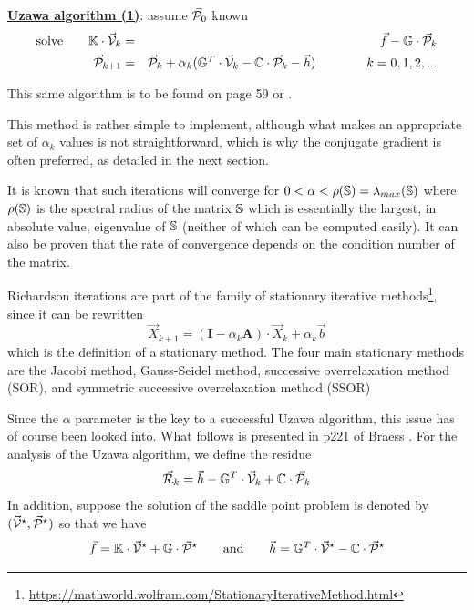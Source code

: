 \begin{mdframed}[backgroundcolor=blue!5]
\underline{\bf Uzawa algorithm (1)}: assume $\vec{\cal P}_0$ known
\begin{eqnarray}
\text{solve} \qquad \mathbb{K} \cdot \vec{\cal V}_k &=& \vec f - \mathbb{G}\cdot \vec {\cal P}_{k} \\
\vec{\cal P}_{k+1} &=& 
\vec{\cal P}_{k}  + \alpha_k (\mathbb{G}^T\cdot \vec{\cal V}_k  -{\mathbb{C}} \cdot \vec{\cal P}_{k} -\vec h)
\quad
\quad
\quad
\quad
k=0,1,2, ... \label{uzaa2}
\end{eqnarray}
\end{mdframed}
This same algorithm is to be found on page 59 or \cite{saramito}.

This method is rather simple to implement, although
what makes an appropriate set of $\alpha_k$ values is not 
straightforward, which is why the conjugate gradient is often preferred, 
as detailed in the next section. 

It is known that such iterations will converge for $0< \alpha < \rho({\mathbb{S}})= \lambda_{max}({\mathbb{S}})$ 
where $\rho({\mathbb{S}})$ is the spectral radius of the matrix ${\mathbb{S}}$
which is essentially the largest, in absolute value, eigenvalue of ${\mathbb{S}}$ (neither of which 
can be computed easily).  
It can also be proven that the rate of convergence depends on the condition number of the matrix.

Richardson iterations are part of the family of stationary iterative 
methods\footnote{\url{https://mathworld.wolfram.com/StationaryIterativeMethod.html}}, 
since it can be rewritten 
\begin{equation}
{\vec X}_{k+1} = ({\bm I} - \alpha_k {\bm A} ) \cdot {\vec X}_k + \alpha_k {\vec b}
\end{equation}
which is the definition of a stationary method. 
The four main stationary methods are the Jacobi method, 
Gauss-Seidel method, successive overrelaxation method (SOR), 
and symmetric successive overrelaxation method (SSOR)


Since the $\alpha$ parameter is the key to a successful Uzawa algorithm, 
this issue has of course been looked into. What follows is 
presented in p221 of Braess \cite{braess}.
For the analysis of the Uzawa algorithm, we define the residue
\[
\vec {\cal R}_k = \vec h - \mathbb{G}^T \cdot \vec{\cal V}_k  +{\mathbb{C}} \cdot \vec{\cal P}_{k}
\]
In addition, suppose the solution of the saddle point problem is denoted
by $(\vec{\cal V}^\star,\vec{\cal P}^\star)$ so that we have
\[
\vec{f} = {\mathbb{K}} \cdot \vec{\cal V}^\star + {\mathbb{G}} \cdot \vec{\cal P}^\star
\qquad
{\rm and}
\qquad
\vec{h} = {\mathbb{G}}^T \cdot \vec{\cal V}^\star - {\mathbb{C}} \cdot \vec{\cal P}^\star 
\]

